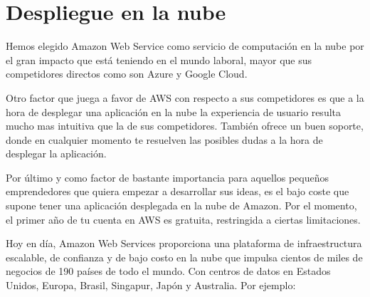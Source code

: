 \chapter{Despliegue en la nube}

Hemos elegido Amazon Web Service como servicio de computación en la nube por el gran impacto que está teniendo en el mundo laboral, mayor que sus competidores directos como son Azure y Google Cloud.

Otro factor que juega a favor de AWS con respecto a sus competidores es que a la hora de desplegar una aplicación en la nube la experiencia de usuario resulta mucho mas intuitiva que la de sus competidores. También ofrece un buen soporte, donde en cualquier momento te resuelven las posibles dudas a la hora de desplegar la aplicación.

Por último y como factor de bastante importancia para aquellos pequeños emprendedores que quiera empezar a desarrollar sus ideas, es el bajo coste que supone tener una aplicación desplegada en la nube de Amazon. Por el momento, el primer año de tu cuenta en AWS es gratuita, restringida a ciertas limitaciones.


Hoy en día, Amazon Web Services proporciona una plataforma de infraestructura escalable, de confianza y de bajo costo en la nube que impulsa cientos de miles de negocios de 190 países de todo el mundo. Con centros de datos en Estados Unidos, Europa, Brasil, Singapur, Japón y Australia. Por ejemplo:


